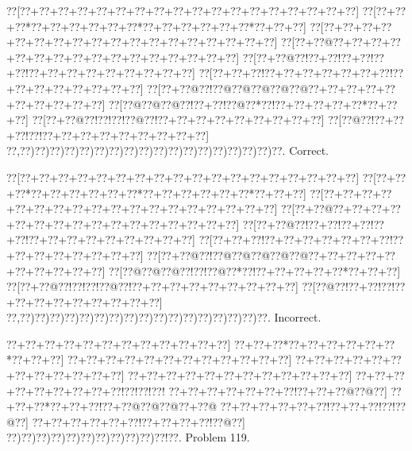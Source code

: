\documentclass[a5paper]{article}
\begin{document}
\begin{center}
{\goo
\0??[\0??+\0??+\0??+\0??+\0??+\0??+\0??+\0??+\0??+\0??+\0??+\0??+\0??+\0??+\0??+\0??+\0??+\0??]
\0??[\0??+\0??+\0??*\0??+\0??+\0??+\0??+\0??+\0??*\0??+\0??+\0??+\0??+\0??+\0??*\0??+\0??+\0??]
\0??[\0??+\0??+\0??+\0??+\0??+\0??+\0??+\0??+\0??+\0??+\0??+\0??+\0??+\0??+\0??+\0??+\0??+\0??]
\0??[\0??+\0??@\0??+\0??+\0??+\0??+\0??+\0??+\0??+\0??+\0??+\0??+\0??+\0??+\0??+\0??+\0??+\0??]
\0??[\0??+\0??@\0??!\0??+\0??!\0??+\0??!\0??+\0??!\0??+\0??+\0??+\0??+\0??+\0??+\0??+\0??+\0??]
\0??[\0??+\0??+\0??!\0??+\0??+\0??+\0??+\0??+\0??+\0??!\0??+\0??+\0??+\0??+\0??+\0??+\0??+\0??]
\0??[\0??+\0??@\0??!\0??@\0??@\0??@\0??@\0??@\0??+\0??+\0??+\0??+\0??+\0??+\0??+\0??+\0??+\0??]
\0??[\0??@\0??@\0??@\0??!\0??+\0??!\0??@\0??*\0??!\0??+\0??+\0??+\0??+\0??*\0??+\0??+\0??]
\0??[\0??+\0??@\0??!\0??!\0??!\0??@\0??!\0??+\0??+\0??+\0??+\0??+\0??+\0??+\0??+\0??]
\0??[\0??@\0??!\0??+\0??+\0??!\0??!\0??+\0??+\0??+\0??+\0??+\0??+\0??+\0??+\0??]
\0??,\0??)\0??)\0??)\0??)\0??)\0??)\0??)\0??)\0??)\0??)\0??)\0??)\0??)\0??)\0??)\0??)\0??)\0??.
}
Correct. 

\end{center}
\begin{center}
{\goo
\0??[\0??+\0??+\0??+\0??+\0??+\0??+\0??+\0??+\0??+\0??+\0??+\0??+\0??+\0??+\0??+\0??+\0??+\0??]
\0??[\0??+\0??+\0??*\0??+\0??+\0??+\0??+\0??+\0??*\0??+\0??+\0??+\0??+\0??+\0??*\0??+\0??+\0??]
\0??[\0??+\0??+\0??+\0??+\0??+\0??+\0??+\0??+\0??+\0??+\0??+\0??+\0??+\0??+\0??+\0??+\0??+\0??]
\0??[\0??+\0??@\0??+\0??+\0??+\0??+\0??+\0??+\0??+\0??+\0??+\0??+\0??+\0??+\0??+\0??+\0??+\0??]
\0??[\0??+\0??@\0??!\0??+\0??!\0??+\0??!\0??+\0??!\0??+\0??+\0??+\0??+\0??+\0??+\0??+\0??+\0??]
\0??[\0??+\0??+\0??!\0??+\0??+\0??+\0??+\0??+\0??+\0??!\0??+\0??+\0??+\0??+\0??+\0??+\0??+\0??]
\0??[\0??+\0??@\0??!\0??@\0??@\0??@\0??@\0??@\0??+\0??+\0??+\0??+\0??+\0??+\0??+\0??+\0??+\0??]
\0??[\0??@\0??@\0??@\0??!\0??!\0??@\0??*\0??!\0??+\0??+\0??+\0??+\0??*\0??+\0??+\0??]
\0??[\0??+\0??@\0??!\0??!\0??!\0??@\0??!\0??+\0??+\0??+\0??+\0??+\0??+\0??+\0??+\0??]
\0??[\0??@\0??!\0??+\0??!\0??!\0??+\0??+\0??+\0??+\0??+\0??+\0??+\0??+\0??]
\0??,\0??)\0??)\0??)\0??)\0??)\0??)\0??)\0??)\0??)\0??)\0??)\0??)\0??)\0??)\0??)\0??)\0??.
}
Incorrect. 

\end{center}
\newpage
\begin{center}
{\goo
\0??+\0??+\0??+\0??+\0??+\0??+\0??+\0??+\0??+\0??+\0??+\0??]
\0??+\0??+\0??*\0??+\0??+\0??+\0??+\0??+\0??*\0??+\0??+\0??]
\0??+\0??+\0??+\0??+\0??+\0??+\0??+\0??+\0??+\0??+\0??+\0??]
\0??+\0??+\0??+\0??+\0??+\0??+\0??+\0??+\0??+\0??+\0??+\0??]
\0??+\0??+\0??+\0??+\0??+\0??+\0??+\0??+\0??+\0??+\0??+\0??]
\0??+\0??+\0??+\0??+\0??+\0??+\0??+\0??+\0??!\0??!\0??!\0??!
\0??+\0??+\0??+\0??+\0??+\0??+\0??!\0??+\0??+\0??@\0??@\0??]
\0??+\0??+\0??*\0??+\0??+\0??!\0??+\0??@\0??@\0??@\0??+\0??@
\0??+\0??+\0??+\0??+\0??+\0??!\0??+\0??+\0??!\0??!\0??@\0??]
\0??+\0??+\0??+\0??+\0??+\0??!\0??+\0??+\0??+\0??!\0??@\0??]
\0??)\0??)\0??)\0??)\0??)\0??)\0??)\0??)\0??)\0??)\0??!\0??.
}
Problem 119.

\end{center}
\end{document}
